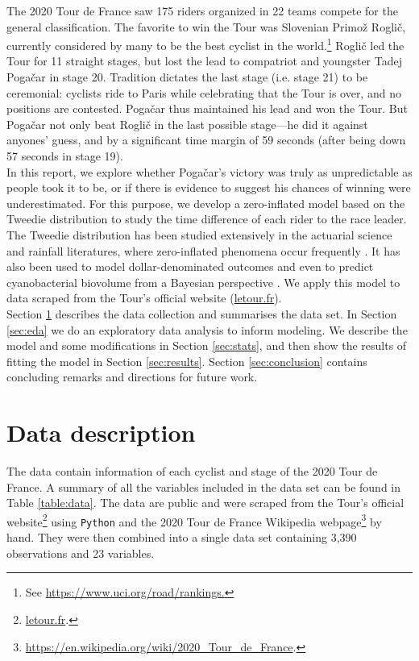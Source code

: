 \documentclass[aos,preprint]{imsart}
\begin{document}
The 2020 Tour de France saw 175 riders organized in 22 teams compete for the general classification. The favorite to win the Tour was Slovenian Primož Roglič, currently considered by many to be the best cyclist in the world.\footnote{See \url{https://www.uci.org/road/rankings.}} Roglič led the Tour for 11 straight stages, but lost the lead to compatriot and youngster Tadej Pogačar in stage 20. Tradition dictates the last stage (i.e. stage 21) to be ceremonial: cyclists ride to Paris while celebrating that the Tour is over, and no positions are contested. Pogačar thus maintained his lead and won the Tour. But Pogačar not only beat Roglič in the last possible stage---he did it against anyones' guess, and by a significant time margin of 59 seconds (after being down 57 seconds in stage 19). \\


In this report, we explore whether Pogačar's victory was truly as unpredictable as people took it to be, or if there is evidence to suggest his chances of winning were underestimated. For this purpose, we develop a zero-inflated model based on the Tweedie distribution to study the time difference of each rider to the race leader. The Tweedie distribution has been studied extensively in the actuarial science and rainfall literatures, where zero-inflated phenomena occur frequently \citep[see][and references therein]{jorgensen1994, withers2011}. It has also been used to model dollar-denominated outcomes \citep{lauderdale2012} and even to predict cyanobacterial biovolume from a Bayesian perspective \citep{haakonsson2020}. We apply this model to data scraped from the Tour's official website (\url{letour.fr}). \\



Section \ref{sec:data} describes the data collection and summarises the data set. In Section \ref{sec:eda} we do an exploratory data analysis to inform modeling. We describe the model and some modifications in Section \ref{sec:stats}, and then show the results of fitting the model in Section \ref{sec:results}. Section \ref{sec:conclusion} contains concluding remarks and directions for future work.


\section{Data description} \label{sec:data}


The data contain information of each cyclist and stage of the 2020 Tour de France. A summary of all the variables included in the data set can be found in Table \ref{table:data}. The data are public and were scraped from the Tour's official website\footnote{\url{letour.fr}.} using \texttt{Python} and the 2020 Tour de France Wikipedia webpage\footnote{\url{https://en.wikipedia.org/wiki/2020_Tour_de_France}.} by hand. They were then combined into a single data set containing 3,390 observations and 23 variables. \\
\end{document}
